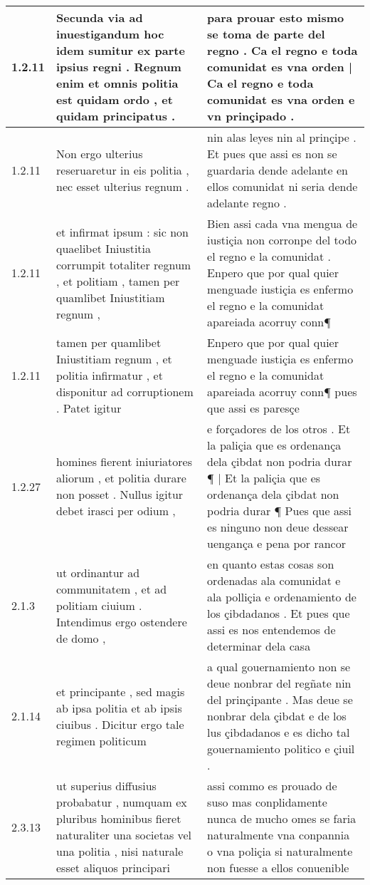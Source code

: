 \begin{tabular}{|p{1cm}|p{6.5cm}|p{6.5cm}|}

\hline
1.2.11 & Secunda via ad inuestigandum hoc idem sumitur ex parte ipsius regni . Regnum enim et omnis politia est quidam ordo , et quidam principatus . & para prouar esto mismo se toma de parte del regno . Ca el regno e toda comunidat es vna orden | Ca el regno e toda comunidat es vna orden e vn prinçipado . \\\hline
1.2.11 & Non ergo ulterius reseruaretur in eis politia , nec esset ulterius regnum . & nin alas leyes nin al prinçipe . Et pues que assi es non se guardaria dende adelante en ellos comunidat ni seria dende adelante regno . \\\hline
1.2.11 & et infirmat ipsum : sic non quaelibet Iniustitia corrumpit totaliter regnum , et politiam , tamen per quamlibet Iniustitiam regnum , & Bien assi cada vna mengua de iustiçia non corronpe del todo el regno e la comunidat . Enpero que por qual quier menguade iustiçia es enfermo el regno e la comunidat apareiada acorruy conn¶ \\\hline
1.2.11 & tamen per quamlibet Iniustitiam regnum , et politia infirmatur , et disponitur ad corruptionem . Patet igitur & Enpero que por qual quier menguade iustiçia es enfermo el regno e la comunidat apareiada acorruy conn¶ pues que assi es paresçe \\\hline
1.2.27 & homines fierent iniuriatores aliorum , et politia durare non posset . Nullus igitur debet irasci per odium , & e forçadores de los otros . Et la paliçia que es ordenança dela çibdat non podria durar ¶ | Et la paliçia que es ordenança dela çibdat non podria durar ¶ Pues que assi es ninguno non deue dessear uengança e pena por rancor \\\hline
2.1.3 & ut ordinantur ad communitatem , et ad politiam ciuium . Intendimus ergo ostendere de domo , & en quanto estas cosas son ordenadas ala comunidat e ala polliçia e ordenamiento de los çibdadanos . Et pues que assi es nos entendemos de determinar dela casa \\\hline
2.1.14 & et principante , sed magis ab ipsa politia et ab ipsis ciuibus . Dicitur ergo tale regimen politicum & a qual gouernamiento non se deue nonbrar del regñate nin del prinçipante . Mas deue se nonbrar dela çibdat e de los lus çibdadanos e es dicho tal gouernamiento politico e çiuil . \\\hline
2.3.13 & ut superius diffusius probabatur , numquam ex pluribus hominibus fieret naturaliter una societas vel una politia , nisi naturale esset aliquos principari & assi commo es prouado de suso mas conplidamente nunca de mucho omes se faria naturalmente vna conpannia o vna poliçia si naturalmente non fuesse a ellos conuenible \\\hline

\end{tabular}
